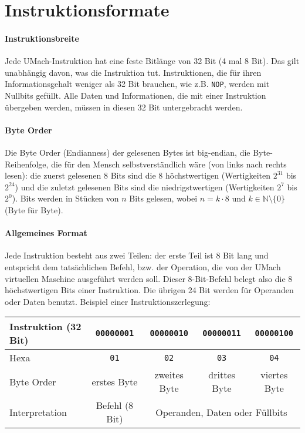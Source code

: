 \section{Instruktionsformate}

\paragraph{Instruktionsbreite}
Jede UMach-Instruktion hat eine feste Bitlänge von 32 Bit (4 mal 8 Bit).
Das gilt unabhängig davon, was die Instruktion tut. Instruktionen, die für ihren
Informationsgehalt weniger als 32 Bit brauchen, wie z.B. \texttt{NOP},
werden mit Nullbits gefüllt. Alle Daten und Informationen, die mit einer
Instruktion übergeben werden, müssen in diesen 32 Bit untergebracht werden.

\paragraph{Byte Order}
Die Byte Order (Endianness) der gelesenen \glspl{Byte} ist
big-endian, die Byte-Reihenfolge, die für den Mensch selbstverständlich wäre
(von links nach rechts lesen):
die zuerst gelesenen 8 Bits sind die 8 höchstwertigen (Wertigkeiten $2^{31}$ bis
$2^{24}$) und die zuletzt gelesenen Bits sind die niedrigstwertigen
(Wertigkeiten $2^{7}$ bis $2^{0}$).
Bits werden in Stücken von $n$ Bits gelesen, wobei $n = k \cdot 8$ und
$k \in \mathbb{N} \setminus\{0\}$ (Byte für Byte).


\paragraph{Allgemeines Format}
Jede \gls{Instruktion} besteht aus zwei Teilen: der erste Teil ist
8 Bit lang und entspricht dem tatsächlichen \gls{Befehl}, bzw. der Operation,
die von der UMach virtuellen Maschine ausgeführt werden soll.
Dieser 8-Bit-Befehl belegt also die 8 höchstwertigen Bits einer Instruktion.
Die übrigen 24 Bit werden für Operanden oder Daten benutzt. Beispiel einer
Instruktionszerlegung:

\begin{center}
  \begin{tabular}{|l|*{4}{c|}}
    \hline
    Instruktion (32 Bit) &
    \texttt{00000001} & \texttt{00000010} & \texttt{00000011} & \texttt{00000100}
    \\\hline
    Hexa  &
    \texttt{01}   & \texttt{02}   & \texttt{03}   & \texttt{04}
    \\\hline
    Byte Order &
    erstes Byte   & zweites Byte  & drittes Byte  & viertes Byte
    \\\hline
    Interpretation &
    Befehl (8 Bit) &  \multicolumn{3}{c|}{Operanden, Daten oder Füllbits}
    \\\hline
  \end{tabular}
\end{center}

